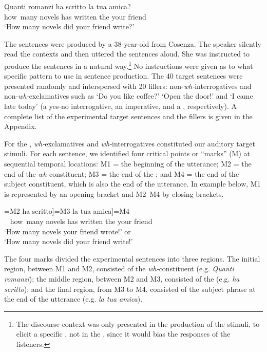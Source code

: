 \documentclass[output=paper]{langsci/langscibook}
\begin{document}
\gll Quanti   romanzi  ha  scritto   la   tua    amica?    \\
     how~many novels   has written   the your friend\\
\glt ‘How many novels did your friend write?’
\z


The sentences were produced by a 38-year-old  from Cosenza. The speaker silently read the contexts and then uttered the sentences aloud. She was instructed to produce the sentences in a natural way.\footnote{The discourse context was only presented in the production of the stimuli, to elicit a specific , not in the , since it would bias the responses of the listeners.} No instructions were given as to what specific  pattern to use in sentence production. The 40 target sentences were presented randomly and interspersed with 20 fillers: non-\textit{wh-}interrogatives and non-\textit{wh-}exclamatives such as ‘Do you like coffee?’ ‘Open the door!’ and ‘I came late today’ (a yes-no interrogative, an imperative, and a , respectively). A complete list of the experimental target sentences and the fillers is given in the Appendix.

For the , \textit{wh-}exclamatives and \textit{wh-}interrogatives constituted our auditory target stimuli. For each sentence, we identified four critical points or “marks” (M) at sequential temporal locations: M1 = the beginning of the utterance; M2 = the end of the \textit{wh-}constituent; M3 = the end of the ; and M4 = the end of the subject constituent, which is also the end of the utterance. In example  below, M1 is represented by an opening bracket and M2–M4 by closing brackets.


\ea\label{ex:kel:8}
\gll [=M1 Quanti romanzi]=M2 ha scritto]=M3  la   tua    amica]=M4 \\
 ~ how~many novels     has written       the your friend\\
\glt ‘How many novels your friend wrote!’ or \\
\glt ‘How many novels did your friend write!’ 
\z


The four marks divided the experimental sentences into three regions. The initial region, between M1 and M2, consisted of the \textit{wh-}constituent (e.g. \textit{Quanti romanzi}); the middle region, between M2 and M3, consisted of the  (e.g. \textit{ha scritto}); and the final region, from M3 to M4, consisted of the subject phrase at the end of the utterance (e.g. \textit{la tua amica}).
\end{document}
